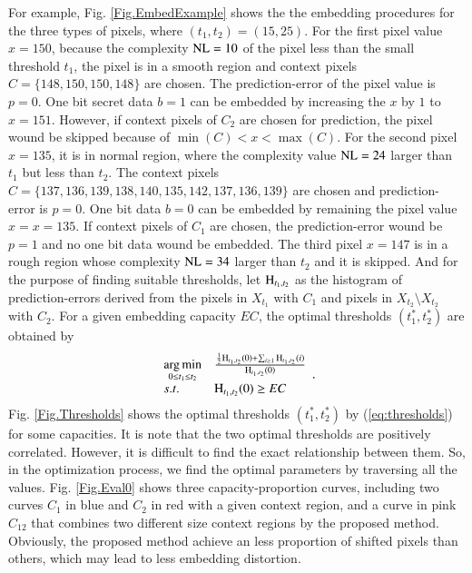 \documentclass[review,3p,10pt,sort&compress]{elsarticle}
\begin{document}
For example, Fig. \ref{Fig.EmbedExample} shows the the embedding procedures for the three types of pixels, where $(t_1, t_2) = (15, 25)$. For the first pixel value $x = 150$, because the complexity ${\rm NL} = 10$ of the pixel less than the small threshold $t_1$, the pixel is in a smooth region and context pixels $C = \{148, 150, 150, 148\}$ are chosen. The prediction-error of the pixel value is $p = 0$. One bit secret data $b = 1$ can be embedded by increasing the $x$ by $1$ to $\hat{x} = 151$. However, if context pixels of $C_2$ are chosen for prediction, the pixel wound be skipped because of $\min(C) < x < \max(C)$. For the second pixel $x = 135$, it is in normal region, where the complexity value ${\rm NL} = 24$ larger than $t_1$ but less than $t_2$. The context pixels $C = \{137, 136, 139, 138, 140, 135, 142, 137, 136, 139\}$ are chosen and prediction-error is $p = 0$. One bit data $b = 0$ can be embedded by remaining the pixel value $\hat{x} = x = 135$. If context pixels of $C_1$ are chosen, the prediction-error wound be $p = 1$ and no one bit data wound be embedded. The third pixel $x = 147$ is in a rough region whose complexity ${\rm NL} = 34$ larger than $t_2$ and it is skipped.
And for the purpose of finding suitable thresholds, let ${\rm H}_{t_1, t_2}$ as the histogram of prediction-errors derived from the pixels in $X_{t_1}$ with $C_1$ and pixels in $X_{t_2} \setminus X_{t_2}$ with $C_2$. For a given embedding capacity $EC$, the optimal thresholds $(t_1^*, t_2^*)$ are obtained by
\begin{equation}\label{eq:thresholds}
\begin{array}{ll}
\mathop{\arg\min}\limits_{0 \leq t_1 \leq t_2} & \frac{\frac{1}{2}{\rm H}_{t_1, t_2}(0) + \sum_{i \geq 1}{\rm H}_{t_1, t_2}(i)}{{\rm H}_{t_1, t_2}(0)}\\
s.t.                                    & {\rm H}_{t_1, t_2}(0) \geq EC
\end{array}.
\end{equation}
Fig. \ref{Fig.Thresholds} shows the optimal thresholds $(t_1^*, t_2^*)$ by (\ref{eq:thresholds}) for some capacities. It is note that the two optimal thresholds are positively correlated. However, it is difficult to find the exact relationship between them. So, in the optimization process, we find the optimal parameters by traversing all the values.
Fig. \ref{Fig.Eval0} shows three capacity-proportion curves, including two curves $C_1$ in blue and $C_2$ in red with a given context region, and a curve in pink $C_{12}$ that combines two different size context regions by the proposed method. Obviously, the proposed method achieve an less proportion of shifted pixels than others, which may lead to less embedding distortion.
\end{document}
